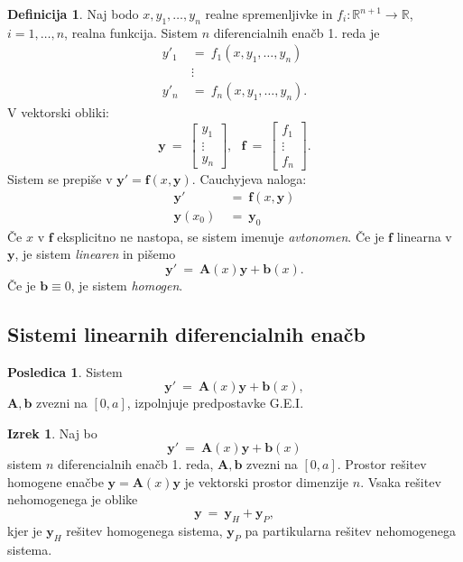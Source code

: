 \documentclass[11pt]{article}
\newcommand{\R}{\mathbb{R}}
\renewcommand{\b}{\mathbf{b}}
\newcommand{\f}{\mathbf{f}}
\newcommand{\y}{\mathbf{y}}
\newcommand{\A}{\mathbf{A}}
\newcommand{\0}{\mathbf{0}}
\theoremstyle{definition}
\newtheorem{definicija}{Definicija}[section]
\theoremstyle{definition}
\theoremstyle{definition}
\newtheorem{izrek}{Izrek}[section]
\theoremstyle{definition}
\newtheorem*{posledica}{Posledica}
\begin{document}
\begin{definicija}

Naj bodo $x,y_1,\ldots,y_n$ realne spremenljivke in $f_i: \R^{n+1} \rightarrow \R$, $i = 1,\ldots,n$, realna funkcija. Sistem $n$ diferencialnih enačb 1. reda je
\begin{align*}
y'_1 ~&=~ f_1(x,y_1,\ldots,y_n) \\
&\vdots \\
y'_n ~&=~ f_n(x,y_1,\ldots,y_n).
\end{align*}
V vektorski obliki:
$$\y ~=~ \begin{bmatrix}
y_1 \\
\vdots \\
y_n
\end{bmatrix}, ~~~\f ~=~ \begin{bmatrix}
f_1 \\
\vdots \\
f_n
\end{bmatrix}.$$
Sistem se prepiše v $\y' = \f(x,\y)$. Cauchyjeva naloga:
\begin{align*}
\y' ~&=~ \f(x,\y) \\
\y(x_0) ~&=~ \y_0
\end{align*}
Če $x$ v $\f$ eksplicitno ne nastopa, se sistem imenuje \textit{avtonomen}. Če je $\f$ linearna v $\y$, je sistem \textit{linearen} in pišemo
$$\y' ~=~ \A(x)\y + \b(x).$$
Če je $\b \equiv 0$, je sistem \textit{homogen}. 

\end{definicija}
\vspace{0.5cm}


\subsection{Sistemi linearnih diferencialnih enačb}
\vspace{0.5cm}

\begin{posledica}

Sistem
$$\y' ~=~ \A(x)\y + \b(x),$$
$\A,\b$ zvezni na $[0,a]$, izpolnjuje predpostavke G.E.I.

\end{posledica}
\vspace{0.5cm}

\begin{izrek}

Naj bo 
$$\y' ~=~ \A(x)\y + \b(x)$$
sistem $n$ diferencialnih enačb 1. reda, $\A,\b$ zvezni na $[0,a]$. Prostor rešitev homogene enačbe $\y = \A(x)\y$ je vektorski prostor dimenzije $n$. Vsaka rešitev nehomogenega je oblike
$$\y ~=~ \y_H + \y_P,$$
kjer je $\y_H$ rešitev homogenega sistema, $\y_P$ pa partikularna rešitev nehomogenega sistema.

\end{izrek}
\vspace{0.5cm}
\end{document}
